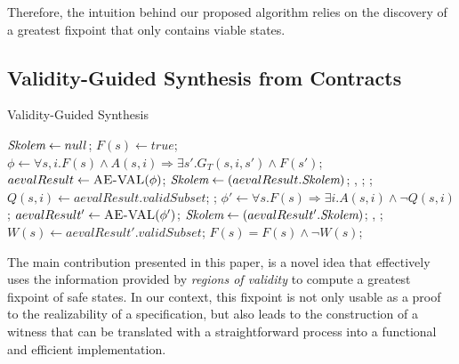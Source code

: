 Therefore, the intuition behind our proposed algorithm relies on the discovery
of a greatest fixpoint that only contains viable states.


\subsection{Validity-Guided Synthesis from Contracts}
\label{sec:synth}

\begin{algorithm*}[!t]
\footnotesize
\caption{Validity-Guided Synthesis}\label{alg:synthesis}
\begin{algorithmic}
	\State $\textit{Skolem} \gets null$;
	\State $F(s) \gets true$;
		\State $\phi \gets \forall s,i. F(s) \land A(s,i) \Rightarrow \exists s'.
			G_{T}(s,i,s') \land F(s')$;
		\State $aevalResult \gets \textsc{AE-VAL}(\phi)$;
			\State $\textit{Skolem} \gets (aevalResult.\textit{Skolem})$;
				\Return \realizable, %
		 		\skolems;
			\Else{}
		 		\Return \unrealizable;
		 	\EndIf
		\Else
			\State $Q(s,i) \gets aevalResult.validSubset$;
				\Return \unrealizable;
			\EndIf
			\State $\phi' \gets \forall s. F(s) \Rightarrow \exists i. A(s,i) \land \lnot
			Q(s,i)$;
			\State $aevalResult' \gets \textsc{AE-VAL}(\phi')$;		
				\State $\textit{Skolem} \gets (aevalResult'.\textit{Skolem})$;			
				\Return \unrealizable, \skolems;
			\Else{}
				\State $W(s) \gets aevalResult'.validSubset$;
				\State $F(s) = F(s) \land \lnot W(s)$;
			\EndIf
		\EndIf
	\EndWhile
\EndProcedure	
\end{algorithmic}
\end{algorithm*}

The main contribution presented in this paper, is a novel idea that effectively
uses the information provided by \textit{regions of validity} to compute a
greatest fixpoint of safe states. In our context, this fixpoint is not only
usable as a proof to the realizability of a specification, but also leads to the
construction of a witness that can be translated with a straightforward process
into a functional and efficient implementation.

